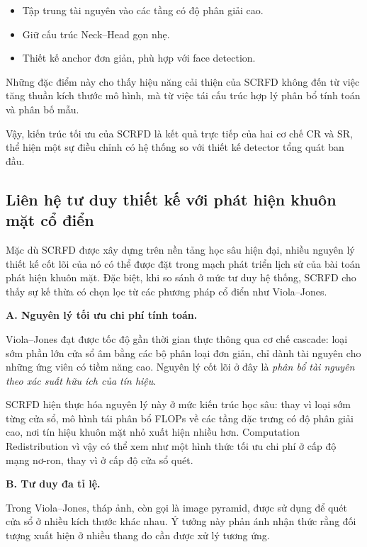 \begin{itemize}
  \item Tập trung tài nguyên vào các tầng có độ phân giải cao.
  \item Giữ cấu trúc Neck–Head gọn nhẹ.
  \item Thiết kế anchor đơn giản, phù hợp với face detection.
\end{itemize}

Những đặc điểm này cho thấy hiệu năng cải thiện của SCRFD không đến từ việc tăng thuần kích thước mô hình, mà từ việc tái cấu trúc hợp lý phân bổ tính toán và phân bố mẫu.

\medskip
\noindent
Vậy, kiến trúc tối ưu của SCRFD là kết quả trực tiếp của hai cơ chế CR và SR, thể hiện một sự điều chỉnh có hệ thống so với thiết kế detector tổng quát ban đầu. 

\subsection{Liên hệ tư duy thiết kế với phát hiện khuôn mặt cổ điển}

Mặc dù SCRFD được xây dựng trên nền tảng học sâu hiện đại, nhiều nguyên lý thiết kế cốt lõi của nó có thể được đặt trong mạch phát triển lịch sử của bài toán phát hiện khuôn mặt. 
Đặc biệt, khi so sánh ở mức tư duy hệ thống, SCRFD cho thấy sự kế thừa có chọn lọc từ các phương pháp cổ điển như Viola--Jones.

\medskip
\noindent\textbf{A. Nguyên lý tối ưu chi phí tính toán.}

Viola--Jones đạt được tốc độ gần thời gian thực thông qua cơ chế cascade: loại sớm phần lớn cửa sổ âm bằng các bộ phân loại đơn giản, chỉ dành tài nguyên cho những ứng viên có tiềm năng cao. 
Nguyên lý cốt lõi ở đây là \textit{phân bổ tài nguyên theo xác suất hữu ích của tín hiệu}.

SCRFD hiện thực hóa nguyên lý này ở mức kiến trúc học sâu: thay vì loại sớm từng cửa sổ, mô hình tái phân bổ FLOPs về các tầng đặc trưng có độ phân giải cao, nơi tín hiệu khuôn mặt nhỏ xuất hiện nhiều hơn. 
Computation Redistribution vì vậy có thể xem như một hình thức tối ưu chi phí ở cấp độ mạng nơ-ron, thay vì ở cấp độ cửa sổ quét.

\medskip
\noindent\textbf{B. Tư duy đa tỉ lệ.}

Trong Viola--Jones, tháp ảnh, còn gọi là image pyramid, được sử dụng để quét cửa sổ ở nhiều kích thước khác nhau. 
Ý tưởng này phản ánh nhận thức rằng đối tượng xuất hiện ở nhiều thang đo cần được xử lý tương ứng.

